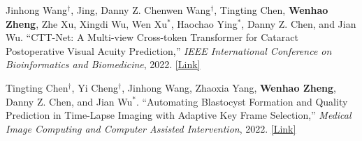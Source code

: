 \begin{cventries}
{\begin{cvitemize2}
            \vspace{1mm}
            \item Jinhong Wang$^\dagger$, Jing, Danny Z. Chenwen Wang$^\dagger$, Tingting Chen, \textbf{Wenhao Zheng}, Zhe Xu, Xingdi Wu, Wen Xu$^*$, Haochao Ying$^*$, Danny Z. Chen, and Jian Wu. ``CTT-Net: A Multi-view Cross-token Transformer for Cataract Postoperative Visual Acuity Prediction,'' \textit{IEEE International Conference on Bioinformatics and Biomedicine}, 2022. \href{https://ieeexplore.ieee.org/document/9995392}{\textcolor{link}{[Link]}}
            \vspace{1mm}
            \item Tingting Chen$^\dagger$, Yi Cheng$^\dagger$, Jinhong Wang, Zhaoxia Yang, \textbf{Wenhao Zheng}, Danny Z. Chen, and Jian Wu$^*$. ``Automating Blastocyst Formation and Quality Prediction in Time-Lapse Imaging with Adaptive Key Frame Selection,'' \textit{Medical Image Computing and Computer Assisted Intervention}, 2022. \href{https://link.springer.com/chapter/10.1007/978-3-031-16440-8_43}{\textcolor{link}{[Link]}}
        \end{cvitemize2}
    }
\end{cventries}
